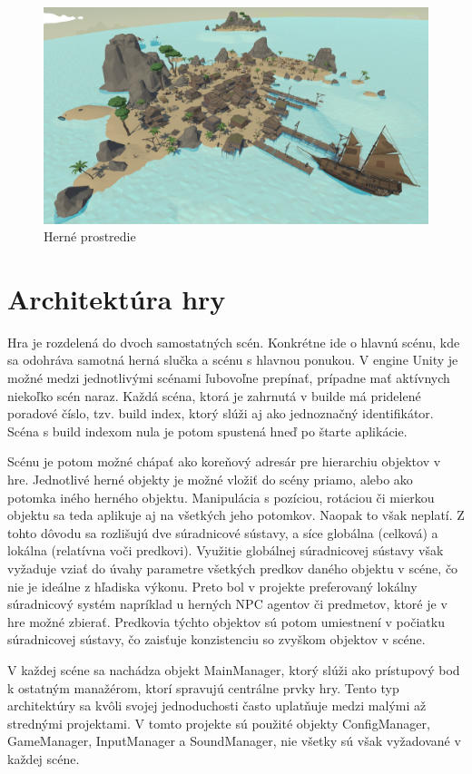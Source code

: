 \documentclass[slovak, master]{diploma}
\begin{document}
\begin{figure}[!htbp]
    \centering
    \includegraphics[width=.9\textwidth]{Figures/game_compressed.png}
    \caption{Herné prostredie}
    \label{pic:GameScreenshot}
\end{figure}

\section{Architektúra hry}
\label{sec:GameStructure}
Hra je rozdelená do dvoch samostatných scén. Konkrétne ide o hlavnú scénu, kde sa odohráva samotná herná slučka a scénu s hlavnou ponukou. V engine Unity je možné medzi jednotlivými scénami ľubovoľne prepínať, prípadne mať aktívnych niekoľko scén naraz. Každá scéna, ktorá je zahrnutá v builde má pridelené poradové číslo, tzv. build index, ktorý slúži aj ako jednoznačný identifikátor. Scéna s build indexom nula je potom spustená hneď po štarte aplikácie.

Scénu je potom možné chápať ako koreňový adresár pre hierarchiu objektov v hre. Jednotlivé herné objekty je možné vložiť do scény priamo, alebo ako potomka iného herného objektu. Manipulácia s pozíciou, rotáciou či mierkou objektu sa teda aplikuje aj na všetkých jeho potomkov. Naopak to však neplatí. Z tohto dôvodu sa rozlišujú dve súradnicové sústavy, a síce globálna (celková) a lokálna (relatívna voči predkovi). Využitie globálnej súradnicovej sústavy však vyžaduje vziať do úvahy parametre všetkých predkov daného objektu v scéne, čo nie je ideálne z hľadiska výkonu. Preto bol v projekte preferovaný lokálny súradnicový systém napríklad u herných NPC agentov či predmetov, ktoré je v hre možné zbierať. Predkovia týchto objektov sú potom umiestnení v počiatku súradnicovej sústavy, čo zaisťuje konzistenciu so zvyškom objektov v scéne.

V každej scéne sa nachádza objekt MainManager, ktorý slúži ako prístupový bod k ostatným manažérom, ktorí spravujú centrálne prvky hry. Tento typ architektúry sa kvôli svojej jednoduchosti často uplatňuje medzi malými až strednými projektami. V tomto projekte sú použité objekty ConfigManager, GameManager, InputManager a SoundManager, nie všetky sú však vyžadované v každej scéne. 
\end{document}
